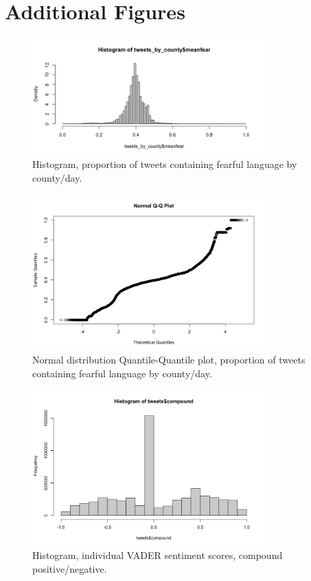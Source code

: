 \documentclass[12pt,a4]{article}
\begin{document}
\section{Additional Figures} \label{add-figs}
\begin{figure}[h!]
  \includegraphics[width=0.8\textwidth]{figs/n30_hist.png}    
  \centering
  \caption{Histogram, proportion of tweets containing fearful language by county/day.}
  \label{n30_hist}
\end{figure}
\begin{figure}[h!]
  \includegraphics[width=0.8\textwidth]{figs/n30_qplot.png}    
  \centering
  \caption{Normal distribution Quantile-Quantile plot, proportion of tweets containing fearful language by county/day.}
  \label{n30_qplot}
\end{figure}
\begin{figure}[h!]
  \includegraphics[width=0.8\textwidth]{figs/compound_hist.png}    
  \centering
  \caption{Histogram, individual VADER sentiment scores, compound positive/negative.}
  \label{comp_hist}
  
\end{figure}
\end{document}
